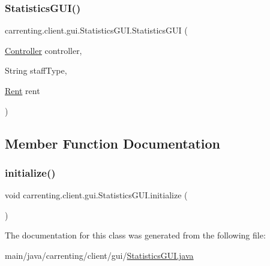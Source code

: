\subsubsection{\texorpdfstring{StatisticsGUI()}{StatisticsGUI()}}
{\footnotesize\ttfamily carrenting.\+client.\+gui.\+Statistics\+G\+U\+I.\+Statistics\+G\+UI (\begin{DoxyParamCaption}\item[{\mbox{\hyperlink{classcarrenting_1_1client_1_1_controller}{Controller}}}]{controller,  }\item[{String}]{staff\+Type,  }\item[{\mbox{\hyperlink{classcarrenting_1_1server_1_1jdo_1_1_rent}{Rent}}}]{rent }\end{DoxyParamCaption})}



\subsection{Member Function Documentation}
\mbox{\label{classcarrenting_1_1client_1_1gui_1_1_statistics_g_u_i_a3b85a88b18774ebb23ef80a5dcebaceb}} 
\subsubsection{\texorpdfstring{initialize()}{initialize()}}
{\footnotesize\ttfamily void carrenting.\+client.\+gui.\+Statistics\+G\+U\+I.\+initialize (\begin{DoxyParamCaption}{ }\end{DoxyParamCaption})}



The documentation for this class was generated from the following file\+:\begin{DoxyCompactItemize}
\item 
main/java/carrenting/client/gui/\mbox{\hyperlink{_statistics_g_u_i_8java}{Statistics\+G\+U\+I.\+java}}\end{DoxyCompactItemize}
